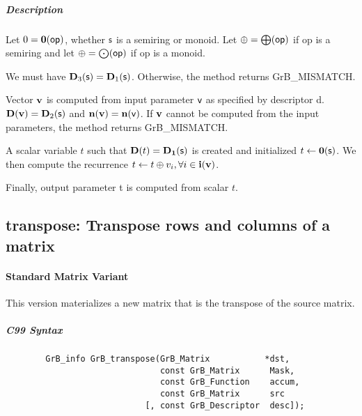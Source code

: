 \subparagraph{Description}

Let $0 = \bold{0}({\sf op})$, whether ${\sf s}$ is a semiring or monoid.
Let $\oplus = \bigoplus({\sf op})$ if op is a semiring and let 
$\oplus = \bigodot({\sf op})$ if op is a monoid.

We must have $\bold{D}_3({\sf s}) = \bold{D}_1({\sf s})$.
Otherwise, the method returns {\sf GrB\_MISMATCH}.

Vector ${\bf v}$ is computed from input parameter ${\sf v}$ as
specified by descriptor {\sf d}. $\bold{D}({\bf v}) = \bold{D}_2({\sf s})$
and $\bold{n}({\bf v}) = \bold{n}({\sf v})$. If ${\bf v}$ cannot be computed
from the input parameters, the method returns {\sf GrB\_MISMATCH}.

A scalar variable $t$ such that $\bold{D}(t) = \bold{D_1}({\sf s})$ is
created and initialized $t \leftarrow \bold{0}({\sf s})$. 
We then compute the recurrence $t \leftarrow t \oplus v_i, \forall i \in {\bf i}({\bf v})$.

Finally, output parameter {\sf t} is computed from scalar $t$.


\subsection{{\sf transpose}: Transpose rows and columns of a matrix}


\paragraph{Standard Matrix Variant}

This version materializes a new matrix that is the transpose of the source matrix.


\subparagraph{C99 Syntax}

\begin{verbatim}
        GrB_info GrB_transpose(GrB_Matrix           *dst,
                               const GrB_Matrix      Mask,
                               const GrB_Function    accum,
                               const GrB_Matrix      src
                            [, const GrB_Descriptor  desc]);
\end{verbatim}

